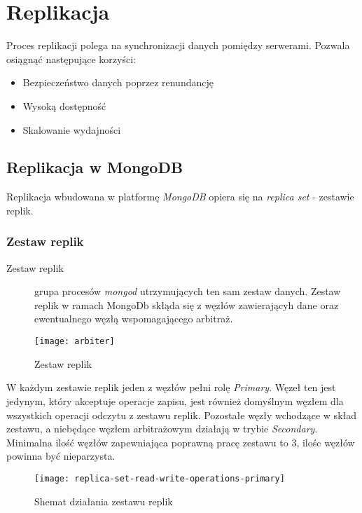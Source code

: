 \section{Replikacja}
Proces replikacji polega na synchronizacji danych pomiędzy serwerami. Pozwala osiągnąć następujące korzyści:
\begin{itemize}
	\item Bezpieczeństwo danych poprzez renundancję
	\item Wysoką dostępność
	\item Skalowanie wydajności
\end{itemize}

\subsection{Replikacja w MongoDB}
Replikacja wbudowana w platformę \textit{MongoDB} opiera się na \textit{replica set} - zestawie replik.

\subsubsection{Zestaw replik}
\begin{description}
\item[Zestaw replik]
 grupa procesów \textit{mongod} utrzymujących ten sam zestaw danych. Zestaw replik w ramach MongoDb skłąda się z węzłów zawierającyh dane oraz ewentualnego węzłą wspomagającego arbitraż.
\end{description}

\begin{figure}[H]
	\centering
	\texttt{[image: arbiter]}
	\caption{Zestaw replik}
	\label{fig:test}
\end{figure}

W każdym zestawie replik jeden z węzłów pełni rolę \textit{Primary}. Węzeł ten jest jedynym, który akceptuje operacje zapisu, jest również domyślnym węzłem dla wszystkich operacji odczytu z zestawu replik. Pozostałe węzły wchodzące w skład zestawu, a niebędące węzłem arbitrażowym działają w trybie \textit{Secondary}. Minimalna ilość węzłów zapewniająca poprawną pracę zestawu to 3, ilośc węzłów powinna być nieparzysta.

\begin{figure}[H]
	\centering
		\texttt{[image: replica-set-read-write-operations-primary]}
	\caption{Shemat działania zestawu replik}
	\label{fig:test}
\end{figure}


